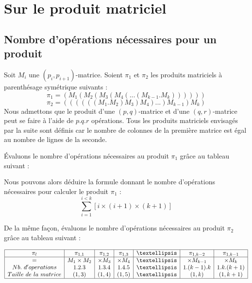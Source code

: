 
\section{Sur le produit matriciel}

\subsection{Nombre d'opérations nécessaires pour un produit}
Soit $M_i$ une $(p_i,p_{i+1})$-matrice. Soient $\pi _1$ et $\pi _2$ les produits matriciels à parenthésage symétrique suivants : 
$$\pi _1 = (M_1(M_2(M_3(M_4(...(M_{k-1}.M_k))))))$$
$$\pi _2 = ((((((M_1.M_2)M_3)M_4)...)M_{k-1})M_k)$$
Nous admettons que le produit d'une $(p,q)$-matrice et d'une $(q,r)$-matrice peut se faire à l'aide de $p.q.r$ opérations. Tous les produits matriciels envisagés par la suite sont définis car le nombre de colonnes de la première matrice est égal au nombre de lignes de la seconde.

Évaluons le nombre d'opérations nécessaires au produit $\pi _1$ grâce au tableau suivant :
\begin{center}
 \end{center}
 
 Nous pouvons alors déduire la formule donnant le nombre d'opérations nécessaires pour calculer le produit $\pi _1$ :
$$ \sum\limits_{i =1}^{i < k} {[i\times (i+1) \times (k+1)]} $$

De la même façon, évaluons le nombre d'opérations nécessaires au produit $\pi _2$ grâce au tableau suivant :
\begin{center}
$ \begin{array}{|c|c|c|c|c|c|c|} \hline
	\pi _l & \pi _{1,1} & \pi _{1,2} & \pi _{1,3} & … & \pi _{1,k-2} & \pi _{1,k-1} \\ \hline
	=  & M_1 \times M_2 & \times M_3 & \times M_{4}  & … & \times M_{k-1} & \times M_k \\
	Nb.\ d'operations & 1.2.3 & 1.3.4 & 1.4.5 & … & 1.(k-1).k & 1.k.(k+1) \\
	Taille\ de\ la\ matrice & (1,3) & (1,4) & (1,5) & … & (1,k) & (1,k+1) \\ \hline
 \end{array} $
 \end{center}
 
